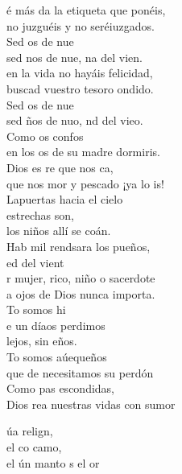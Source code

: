 \begin{cancion}%
	é más da la etiqueta que ponéis,\\
	no juzguéis y no seréiuzgados.\\
	Sed os de nue\\
	sed nos de nue, na del vien.\\
	 en la vida no hayáis felicidad,\\
	buscad vuestro tesoro ondido.\\
	Sed os de nue\\
	sed ños de nuo, nd del vieo.\\
	Como os confos\\
	en los os de su madre dormiris.\\
	Dios es re que nos ca,\\
	que nos mor y pescado ¡ya lo is!\\
	Lapuertas hacia el cielo \\
	\jump
estrechas son,\\
	los niños allí se coán.\\
	Hab mil rendsara los pueños,\\
	ed del vient \\
	r mujer, rico, niño o sacerdote\\
	a ojos de Dios nunca importa.\\
	To somos hi \\
	e un díaos perdimos\\
	 lejos, sin eños.\\
	To somos aúequeños\\
	que de  necesitamos su perdón \\
	Como pas escondidas, \\
	Dios rea nuestras vidas con sumor\jump\\
	\begin{chorus}%
		úa relign,\\
		el co camo,\\
		el ún manto s el or\jump\\
	\end{chorus}%
\end{cancion}%
